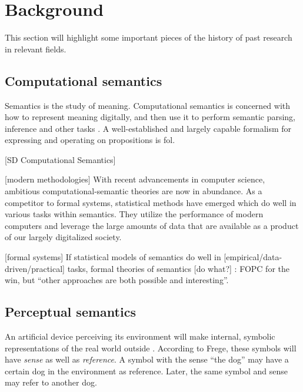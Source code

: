 \glsresetall
\section{Background}
\label{sec:background}

This section will highlight some important pieces of the history of past research in relevant fields.

\subsection{Computational semantics}

Semantics is the study of meaning.
Computational semantics is concerned with how to represent meaning digitally, and then use it to perform semantic parsing, inference and other tasks \citep{BlackburnComputationalsemantics2003}.
A well-established and largely capable formalism for expressing and operating on propositions is \gls{fol}.

\cite{MontagueFormalPhilosophySelected1974}
[SD Computational Semantics]

[modern methodologies]
With recent advancements in computer science, ambitious computational-semantic theories are now in abundance.
As a competitor to formal systems, statistical methods have emerged which do well in various tasks within semantics.
They utilize the performance of modern computers and leverage the large amounts of data that are available as a product of our largely digitalized society.


[formal systems]
If statistical models of semantics do well in [empirical/data-driven/practical] tasks, formal theories of semantics [do what?]
\cite{BlackburnComputationalsemantics2003}:
FOPC for the win, but ``other approaches are both possible and interesting''.

\cite{Dobnik:2017ag}





\subsection{Perceptual semantics}

An artificial device perceiving its environment will make internal, symbolic representations of the real world outside \citep{PustejovskyPerceptualsemanticsconstruction1990}.
According to Frege, these symbols will have \textit{sense} as well as \textit{reference}.
A symbol with the sense ``the dog'' may have a certain dog in the environment as reference.
Later, the same symbol and sense may refer to another dog.

